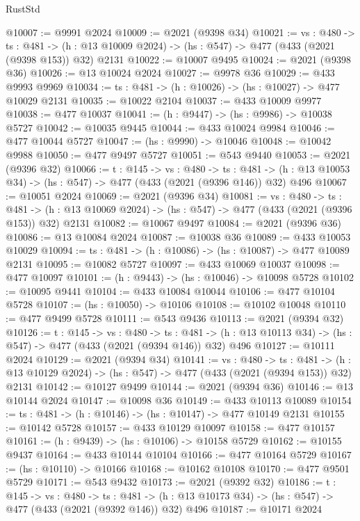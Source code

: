 \begin{lexlean}{RustStd}
\begin{coremodule}
@10007 := @9991 @2024
@10009 := @2021 (@9398 @34)
@10021 := {vs : @480} ->
  {ts : @481} -> (h : @13 @10009 @2024) -> (hs : @547) -> @477 (@433 (@2021 (@9398 @153)) @32) @2131
@10022 := @10007 @9495
@10024 := @2021 (@9398 @36)
@10026 := @13 @10024 @2024
@10027 := @9978 @36
@10029 := @433 @9993 @9969
@10034 := {ts : @481} -> (h : @10026) -> (hs : @10027) -> @477 @10029 @2131
@10035 := @10022 @2104
@10037 := @433 @10009 @9977
@10038 := @477 @10037
@10041 := (h : @9447) -> (hs : @9986) -> @10038 @5727
@10042 := @10035 @9445
@10044 := @433 @10024 @9984
@10046 := @477 @10044 @5727
@10047 := (hs : @9990) -> @10046
@10048 := @10042 @9988
@10050 := @477 @9497 @5727
@10051 := @543 @9440
@10053 := @2021 (@9396 @32)
@10066 := {t : @145} ->
  {vs : @480} ->
  {ts : @481} -> (h : @13 @10053 @34) -> (hs : @547) -> @477 (@433 (@2021 (@9396 @146)) @32) @496
@10067 := @10051 @2024
@10069 := @2021 (@9396 @34)
@10081 := {vs : @480} ->
  {ts : @481} -> (h : @13 @10069 @2024) -> (hs : @547) -> @477 (@433 (@2021 (@9396 @153)) @32) @2131
@10082 := @10067 @9497
@10084 := @2021 (@9396 @36)
@10086 := @13 @10084 @2024
@10087 := @10038 @36
@10089 := @433 @10053 @10029
@10094 := {ts : @481} -> (h : @10086) -> (hs : @10087) -> @477 @10089 @2131
@10095 := @10082 @5727
@10097 := @433 @10069 @10037
@10098 := @477 @10097
@10101 := (h : @9443) -> (hs : @10046) -> @10098 @5728
@10102 := @10095 @9441
@10104 := @433 @10084 @10044
@10106 := @477 @10104 @5728
@10107 := (hs : @10050) -> @10106
@10108 := @10102 @10048
@10110 := @477 @9499 @5728
@10111 := @543 @9436
@10113 := @2021 (@9394 @32)
@10126 := {t : @145} ->
  {vs : @480} ->
  {ts : @481} -> (h : @13 @10113 @34) -> (hs : @547) -> @477 (@433 (@2021 (@9394 @146)) @32) @496
@10127 := @10111 @2024
@10129 := @2021 (@9394 @34)
@10141 := {vs : @480} ->
  {ts : @481} -> (h : @13 @10129 @2024) -> (hs : @547) -> @477 (@433 (@2021 (@9394 @153)) @32) @2131
@10142 := @10127 @9499
@10144 := @2021 (@9394 @36)
@10146 := @13 @10144 @2024
@10147 := @10098 @36
@10149 := @433 @10113 @10089
@10154 := {ts : @481} -> (h : @10146) -> (hs : @10147) -> @477 @10149 @2131
@10155 := @10142 @5728
@10157 := @433 @10129 @10097
@10158 := @477 @10157
@10161 := (h : @9439) -> (hs : @10106) -> @10158 @5729
@10162 := @10155 @9437
@10164 := @433 @10144 @10104
@10166 := @477 @10164 @5729
@10167 := (hs : @10110) -> @10166
@10168 := @10162 @10108
@10170 := @477 @9501 @5729
@10171 := @543 @9432
@10173 := @2021 (@9392 @32)
@10186 := {t : @145} ->
  {vs : @480} ->
  {ts : @481} -> (h : @13 @10173 @34) -> (hs : @547) -> @477 (@433 (@2021 (@9392 @146)) @32) @496
@10187 := @10171 @2024

\end{coremodule}
\end{lexlean}
